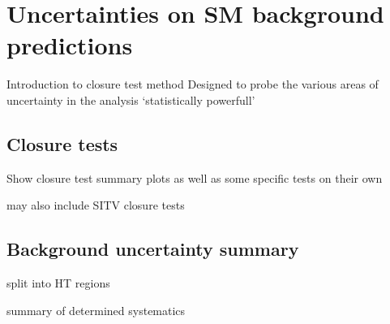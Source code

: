 \section{Uncertainties on SM background predictions}  %
\label{sec:background_systematics}

Introduction to closure test method
Designed to probe the various areas of uncertainty in the analysis
`statistically powerfull'

\subsection{Closure tests}
Show closure test summary plots as well as some specific tests on their own

may also include SITV closure tests

\subsection{Background uncertainty summary}
split into HT regions

summary of determined systematics
